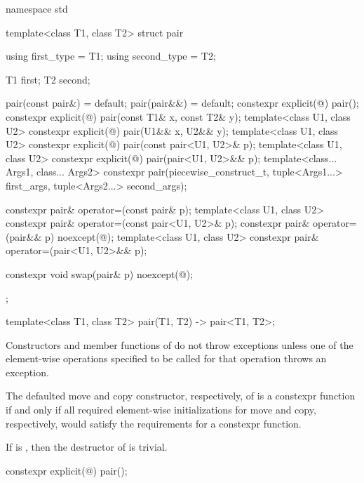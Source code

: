 %
\begin{codeblock}
namespace std {
  template<class T1, class T2>
  struct pair {
    using first_type  = T1;
    using second_type = T2;

    T1 first;
    T2 second;

    pair(const pair&) = default;
    pair(pair&&) = default;
    constexpr explicit(@\seebelow@) pair();
    constexpr explicit(@\seebelow@) pair(const T1& x, const T2& y);
    template<class U1, class U2>
      constexpr explicit(@\seebelow@) pair(U1&& x, U2&& y);
    template<class U1, class U2>
      constexpr explicit(@\seebelow@) pair(const pair<U1, U2>& p);
    template<class U1, class U2>
      constexpr explicit(@\seebelow@) pair(pair<U1, U2>&& p);
    template<class... Args1, class... Args2>
      constexpr pair(piecewise_construct_t,
                     tuple<Args1...> first_args, tuple<Args2...> second_args);

    constexpr pair& operator=(const pair& p);
    template<class U1, class U2>
      constexpr pair& operator=(const pair<U1, U2>& p);
    constexpr pair& operator=(pair&& p) noexcept(@\seebelow@);
    template<class U1, class U2>
      constexpr pair& operator=(pair<U1, U2>&& p);

    constexpr void swap(pair& p) noexcept(@\seebelow@);
  };

  template<class T1, class T2>
    pair(T1, T2) -> pair<T1, T2>;
}
\end{codeblock}

\pnum
Constructors and member functions of  do not throw exceptions unless one of
the element-wise operations specified to be called for that operation
throws an exception.

\pnum
The defaulted move and copy constructor, respectively, of 
is a constexpr function if and only if all required element-wise
initializations for move and copy, respectively, would satisfy the
requirements for a constexpr function.

\pnum
If 
is , then the destructor of  is trivial.

%
\begin{itemdecl}
constexpr explicit(@\seebelow@) pair();
\end{itemdecl}

